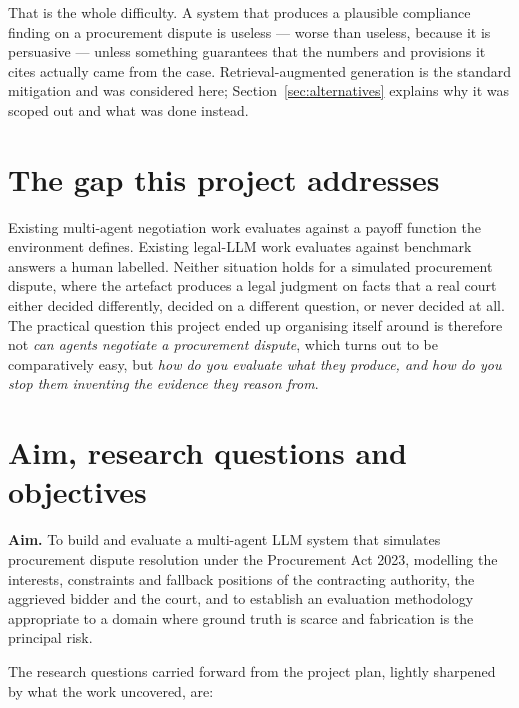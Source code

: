 That is the whole difficulty. A system that produces a plausible compliance
finding on a procurement dispute is useless --- worse than useless, because it is
persuasive --- unless something guarantees that the numbers and provisions it cites
actually came from the case. Retrieval-augmented generation \cite{lewis2020rag}
is the standard mitigation and was considered here; Section~\ref{sec:alternatives}
explains why it was scoped out and what was done instead.

\section{The gap this project addresses}
\label{sec:gap}

Existing multi-agent negotiation work evaluates against a payoff function the
environment defines. Existing legal-LLM work evaluates against benchmark answers a
human labelled. Neither situation holds for a simulated procurement dispute, where
the artefact produces a legal judgment on facts that a real court either decided
differently, decided on a different question, or never decided at all. The
practical question this project ended up organising itself around is therefore
not \emph{can agents negotiate a procurement dispute}, which turns out to be
comparatively easy, but \emph{how do you evaluate what they produce, and how do
you stop them inventing the evidence they reason from}.

\section{Aim, research questions and objectives}
\label{sec:objectives}

\textbf{Aim.} To build and evaluate a multi-agent LLM system that simulates
procurement dispute resolution under the Procurement Act 2023, modelling the
interests, constraints and fallback positions of the contracting authority, the
aggrieved bidder and the court, and to establish an evaluation methodology
appropriate to a domain where ground truth is scarce and fabrication is the
principal risk.

The research questions carried forward from the project plan, lightly sharpened
by what the work uncovered, are:


